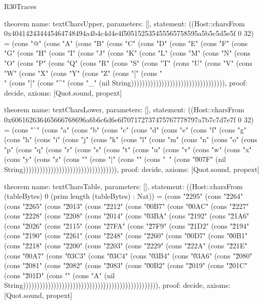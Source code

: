 \begin{lexlean}{R30Traces}
\begin{semanticmodule}
theorem{
  name: textCharsUpper,
  parameters: [],
  statement: ((Host::charsFrom 0x404142434445464748494a4b4c4d4e4f505152535455565758595a5b5c5d5e5f 0 32) = (cons "@" (cons "A" (cons "B" (cons "C" (cons "D" (cons "E" (cons "F" (cons "G" (cons "H" (cons "I" (cons "J" (cons "K" (cons "L" (cons "M" (cons "N" (cons "O" (cons "P" (cons "Q" (cons "R" (cons "S" (cons "T" (cons "U" (cons "V" (cons "W" (cons "X" (cons "Y" (cons "Z" (cons "[" (cons "\\" (cons "]" (cons "^" (cons "_" (nil String)))))))))))))))))))))))))))))))))),
  proof: decide{},
  axioms: [Quot.sound, propext]
}

theorem{
  name: textCharsLower,
  parameters: [],
  statement: ((Host::charsFrom 0x606162636465666768696a6b6c6d6e6f707172737475767778797a7b7c7d7e7f 0 32) = (cons "`" (cons "a" (cons "b" (cons "c" (cons "d" (cons "e" (cons "f" (cons "g" (cons "h" (cons "i" (cons "j" (cons "k" (cons "l" (cons "m" (cons "n" (cons "o" (cons "p" (cons "q" (cons "r" (cons "s" (cons "t" (cons "u" (cons "v" (cons "w" (cons "x" (cons "y" (cons "z" (cons "{" (cons "|" (cons "}" (cons "~" (cons "\u007F" (nil String)))))))))))))))))))))))))))))))))),
  proof: decide{},
  axioms: [Quot.sound, propext]
}

theorem{
  name: textCharsTable,
  parameters: [],
  statement: ((Host::charsFrom (tableBytes) 0 (prim length (tableBytes) : Nat)) = (cons "\u2295" (cons "\u2264" (cons "\u2265" (cons "\u2013" (cons "\u2212" (cons "\u00B7" (cons "\u00AC" (cons "\u2227" (cons "\u2228" (cons "\u2208" (cons "\u2014" (cons "\u03BA" (cons "\u2192" (cons "\u21A6" (cons "\u2026" (cons "\u2115" (cons "\u27FA" (cons "\u27F9" (cons "\u21D2" (cons "\u2194" (cons "\u2190" (cons "\u2261" (cons "\u2248" (cons "\u2260" (cons "\u00D7" (cons "\u00B1" (cons "\u2218" (cons "\u2200" (cons "\u2203" (cons "\u2229" (cons "\u222A" (cons "\u221E" (cons "\u00A7" (cons "\u03C3" (cons "\u03C4" (cons "\u03B4" (cons "\u03A6" (cons "\u2080" (cons "\u2081" (cons "\u2082" (cons "\u2083" (cons "\u00B2" (cons "\u2019" (cons "\u201C" (cons "\u201D" (cons "\uFFFD" (cons "A" (nil String))))))))))))))))))))))))))))))))))))))))))))))))),
  proof: decide{},
  axioms: [Quot.sound, propext]
}

\end{semanticmodule}
\end{lexlean}
